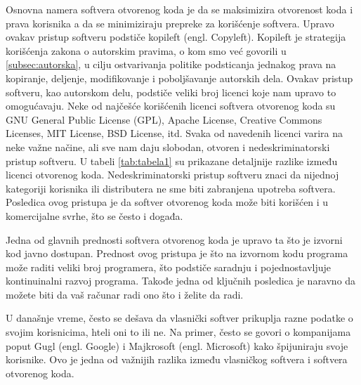 \documentclass[a4paper]{article}
\begin{document}
Osnovna namera softvera otvorenog koda je da se maksimizira otvorenost koda i prava korisnika a da
se minimiziraju prepreke za korišćenje softvera. Upravo ovakav pristup softveru podstiče kopileft (engl. Copyleft).
Kopileft je strategija korišćenja zakona o autorskim pravima, o kom smo već govorili u \ref{subsec:autorska}, u cilju 
ostvarivanja politike podsticanja jednakog prava na kopiranje, deljenje, modifikovanje i poboljšavanje autorskih dela. \cite{copyleft}
Ovakav pristup softveru, kao autorskom delu, podstiče veliki broj licenci koje nam upravo to omogućavaju.
Neke od najčešće korišćenih licenci softvera otvorenog koda su GNU General Public License (GPL), Apache License,
Creative Commons Licenses, MIT License, BSD License, itd. Svaka od navedenih licenci varira na neke važne načine, ali sve nam daju 
slobodan, otvoren i nedeskriminatorski pristup softveru. 
U tabeli \ref{tab:tabela1} su prikazane detaljnije razlike između licenci otvorenog koda. 
Nedeskriminatorski pristup softveru znaci da nijednoj
kategoriji korisnika ili distributera ne sme biti zabranjena upotreba softvera. \cite{opensource}
Posledica ovog pristupa je da softver otvorenog koda može biti korišćen i u komercijalne svrhe, što se često i događa.

Jedna od glavnih prednosti softvera otvorenog koda je upravo ta što je izvorni kod javno dostupan. \cite{opensource} Prednost ovog pristupa je 
što na izvornom kodu programa može raditi veliki broj programera, što podstiče saradnju i pojednostavljuje kontinuinalni 
razvoj programa. Takođe jedna od ključnih posledica je naravno da možete biti da vaš računar radi ono što i želite da radi. 

U današnje vreme, često se dešava da vlasnički softver prikuplja razne podatke o svojim korisnicima,
hteli oni to ili ne. Na primer, često se govori o kompanijama poput Gugl (engl. Google) i Majkrosoft (engl. Microsoft) 
kako špijuniraju svoje korisnike. Ovo je jedna od važnijih razlika između vlasničkog softvera i softvera otvorenog koda.
\end{document}
